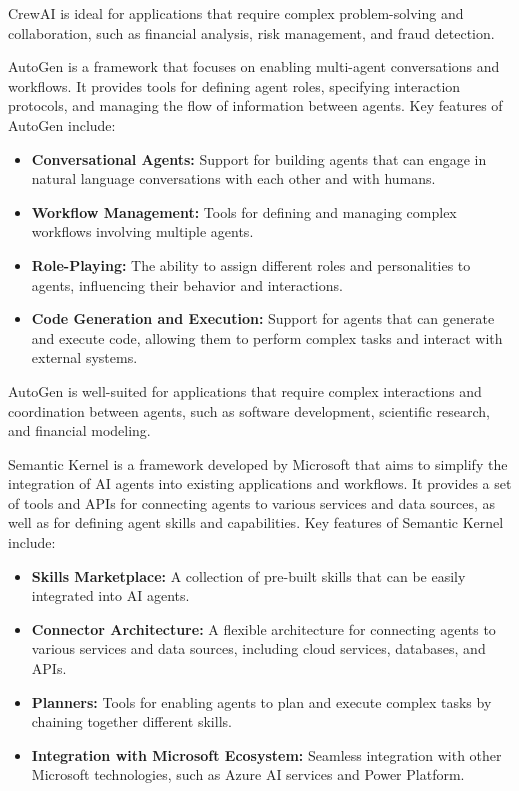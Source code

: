 \documentclass[a4paper,headinclude=on,footinclude=on,12pt,oneside]{scrbook}
\begin{document}
CrewAI is ideal for applications that require complex problem-solving and collaboration, such as financial analysis, risk management, and fraud detection.


AutoGen is a framework that focuses on enabling multi-agent conversations and workflows. It provides tools for defining agent roles, specifying interaction protocols, and managing the flow of information between agents. Key features of AutoGen include:

\begin{itemize}
\item \textbf{Conversational Agents:}  Support for building agents that can engage in natural language conversations with each other and with humans.
\item \textbf{Workflow Management:} Tools for defining and managing complex workflows involving multiple agents.
\item \textbf{Role-Playing:} The ability to assign different roles and personalities to agents, influencing their behavior and interactions.
\item \textbf{Code Generation and Execution:} Support for agents that can generate and execute code, allowing them to perform complex tasks and interact with external systems.
\end{itemize}

AutoGen is well-suited for applications that require complex interactions and coordination between agents, such as software development, scientific research, and financial modeling.


Semantic Kernel is a framework developed by Microsoft that aims to simplify the integration of AI agents into existing applications and workflows. It provides a set of tools and APIs for connecting agents to various services and data sources, as well as for defining agent skills and capabilities. Key features of Semantic Kernel include:

\begin{itemize}
\item \textbf{Skills Marketplace:}  A collection of pre-built skills that can be easily integrated into AI agents.
\item \textbf{Connector Architecture:}  A flexible architecture for connecting agents to various services and data sources, including cloud services, databases, and APIs.
\item \textbf{Planners:} Tools for enabling agents to plan and execute complex tasks by chaining together different skills.
\item \textbf{Integration with Microsoft Ecosystem:} Seamless integration with other Microsoft technologies, such as Azure AI services and Power Platform.
\end{itemize}
\end{document}
